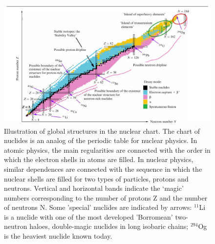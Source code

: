 \begin{figure}[t]
	\begin{center}
		\includegraphics[width=1\textwidth]{figures/map.png}
	\end{center}
	\caption{Illustration of global structures in the nuclear chart. 
		The chart of nuclides is an analog of the periodic table for nuclear physics. 
		In atomic physics, the main regularities are connected with the order in which the electron shells in atoms are filled. 
		In nuclear physics, similar dependences are connected with the sequence in which the nuclear shells are filled for two types of particles, protons and neutrons. 
		Vertical and horizontal bands indicate the `magic' numbers corresponding to the number of protons Z and the number of neutrons N. 
		Some 'special' nuclides are indicated by arrows: $^{11}$Li is a nuclide with one of the most developed 'Borromean' two-neutron haloes, double-magic nuclides in long isobaric chains; $^{294}$Og is the heaviest nuclide known today.}
	\label{fig:nuclear_chart}
\end{figure}

